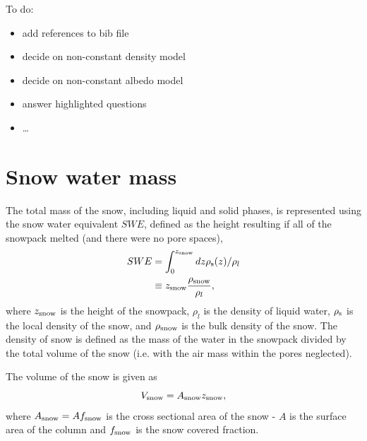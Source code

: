 \documentclass[twoside,10pt]{report}
\begin{document}
To do:
\begin{itemize}
    \item add references to bib file
    \item decide on non-constant density model
    \item decide on non-constant albedo model
    \item answer highlighted questions
    \item \ldots
\end{itemize}





\section{Snow water mass}
The total mass of the snow, including liquid and solid phases, is represented using the snow water equivalent $SWE$, defined as the height resulting if all of the snowpack melted (and there were no pore spaces),
\begin{align}\label{eq:swe1}
    SWE &=\int_0^{z_{\rm snow}} dz \rho_{\rm s}(z)/\rho_l \nonumber \\
    & \equiv z_{\rm snow} \frac{\rho_{\rm snow}}{\rho_l},
\end{align}
where $z_{\rm snow}$ is the height of the snowpack, $\rho_l$ is the density of liquid water, $\rho_{\rm s}$ is the local density of the snow, and $\rho_{\rm snow}$ is the bulk density of the  snow. The density of snow is defined as the mass of the water in the snowpack divided by the total volume of the snow (i.e. with the air mass within the pores neglected).

The volume of the snow is given as
\begin{equation}\label{eq:vsnow}
V_{\rm snow} = A_{\rm snow} z_{\rm snow},
\end{equation}
where $A_{\rm snow} = A f_{\rm snow}$ is the cross sectional area of the snow - $A$ is the surface area of the column and $f_{\rm snow}$ is the snow covered fraction. 
\end{document}
